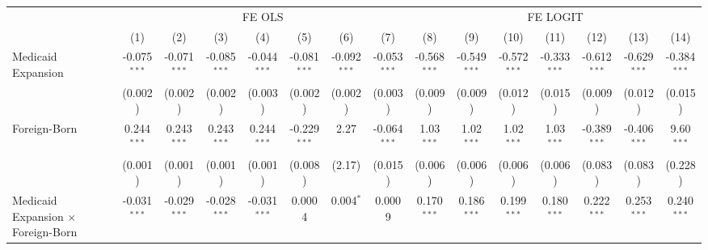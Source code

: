 \documentclass[
]{article}
\let\origtable\table
\let\endorigtable\endtable
\renewenvironment{table}[1][ht]{
      \expandafter\origtable\expandafter[H]
    }{
      \endorigtable
    }
\begin{document}
\begin{table}[htbp]
   \centering
   \begin{adjustbox}{width = 1.5\textwidth, center}
      \begin{threeparttable}[b]
         \caption{The Effect of Medicaid Expansion on Uninsured Rate (Difference-in-Differences Estimation)}
         \renewcommand*{\arraystretch}{1}
         \begin{tabular}{lcccccccccccccc}
            \tabularnewline \midrule \midrule
             & \multicolumn{7}{c}{FE OLS} & \multicolumn{7}{c}{FE LOGIT} \\ \cmidrule(lr){2-8} \cmidrule(lr){9-15}
                                                      & (1)            & (2)            & (3)            & (4)            & (5)            & (6)            & (7)            & (8)            & (9)            & (10)           & (11)           & (12)           & (13)           & (14)\\  
            \midrule 
            Medicaid Expansion                        & -0.075$^{***}$ & -0.071$^{***}$ & -0.085$^{***}$ & -0.044$^{***}$ & -0.081$^{***}$ & -0.092$^{***}$ & -0.053$^{***}$ & -0.568$^{***}$ & -0.549$^{***}$ & -0.572$^{***}$ & -0.333$^{***}$ & -0.612$^{***}$ & -0.629$^{***}$ & -0.384$^{***}$\\   
                                                      & (0.002)        & (0.002)        & (0.002)        & (0.003)        & (0.002)        & (0.002)        & (0.003)        & (0.009)        & (0.009)        & (0.012)        & (0.015)        & (0.009)        & (0.012)        & (0.015)\\   
            Foreign-Born                              & 0.244$^{***}$  & 0.243$^{***}$  & 0.243$^{***}$  & 0.244$^{***}$  & -0.229$^{***}$ & 2.27           & -0.064$^{***}$ & 1.03$^{***}$   & 1.02$^{***}$   & 1.02$^{***}$   & 1.03$^{***}$   & -0.389$^{***}$ & -0.406$^{***}$ & 9.60$^{***}$\\   
                                                      & (0.001)        & (0.001)        & (0.001)        & (0.001)        & (0.008)        & (2.17)         & (0.015)        & (0.006)        & (0.006)        & (0.006)        & (0.006)        & (0.083)        & (0.083)        & (0.228)\\   
            Medicaid Expansion $\times$ Foreign-Born  & -0.031$^{***}$ & -0.029$^{***}$ & -0.028$^{***}$ & -0.031$^{***}$ & 0.0004         & 0.004$^{*}$    & 0.0009         & 0.170$^{***}$  & 0.186$^{***}$  & 0.199$^{***}$  & 0.180$^{***}$  & 0.222$^{***}$  & 0.253$^{***}$  & 0.240$^{***}$\\   

\end{tabular}
\end{threeparttable}
\end{adjustbox}
\end{table}
\end{document}
